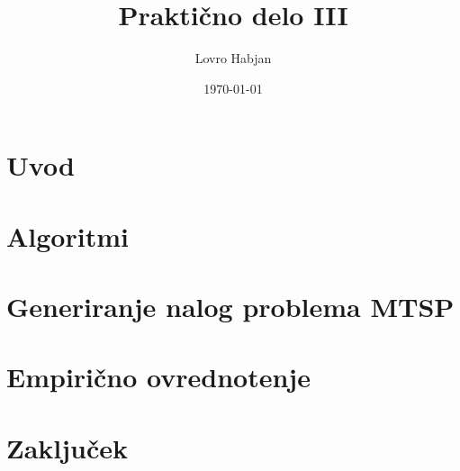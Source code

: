 \documentclass{article}
\title{Praktično delo III}
\author{Lovro Habjan}
\date{\today}
\begin{document}
\maketitle

\section{Uvod}

\section{Algoritmi}

\section{Generiranje nalog problema MTSP}

\section{Empirično ovrednotenje}

\section{Zaključek}
\end{document}
